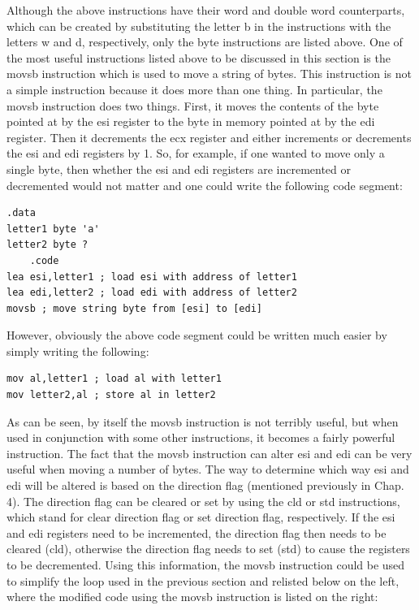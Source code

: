 \documentclass[10pt]{book}
\begin{document}
Although the above instructions have their word and double word counterparts, which can be created by substituting the letter b in the instructions with the letters w and d, respectively, only the byte instructions are listed above. One of the most useful instructions listed above to be discussed in this section is the movsb instruction which is used to move a string of bytes. This instruction is not a simple instruction because it does more than one thing. In particular, the movsb instruction does two things. First, it moves the contents of the byte pointed at by the esi register to the byte in memory pointed at by the edi register. Then it decrements the ecx register and either increments or decrements the esi and edi registers by 1. So, for example, if one wanted to move only a single byte, then whether the esi and edi registers are incremented or decremented would not matter and one could write the following code segment:
\begin{verbatim}
.data
letter1 byte 'a'
letter2 byte ?
    .code
lea esi,letter1 ; load esi with address of letter1
lea edi,letter2 ; load edi with address of letter2
movsb ; move string byte from [esi] to [edi]
\end{verbatim}

However, obviously the above code segment could be written much easier by simply writing the following:

\begin{verbatim}
mov al,letter1 ; load al with letter1
mov letter2,al ; store al in letter2
\end{verbatim}

As can be seen, by itself the movsb instruction is not terribly useful, but when used in conjunction with some other instructions, it becomes a fairly powerful instruction. The fact that the movsb instruction can alter esi and edi can be very useful when moving a number of bytes. The way to determine which way esi and edi will be altered is based on the direction flag (mentioned previously in Chap. 4). The direction flag can be cleared or set by using the cld or std instructions, which stand for clear direction flag or set direction flag, respectively. If the esi and edi registers need to be incremented, the direction flag then needs to be cleared (cld), otherwise the direction flag needs to set (std) to cause the registers to be decremented. Using this information, the movsb instruction could be used to simplify the loop used in the previous section and relisted below on the left, where the modified code using the movsb instruction is listed on the right:
\end{document}
